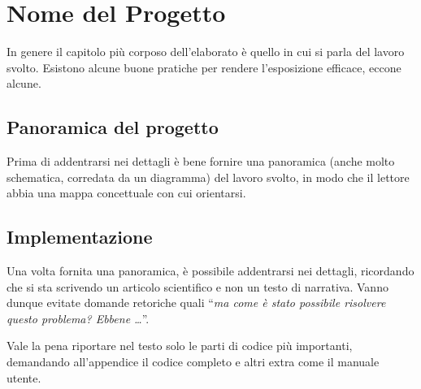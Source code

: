 \chapter{Nome del Progetto}
\label{cap4}

In genere il capitolo più corposo dell'elaborato è quello in cui si parla del lavoro svolto. Esistono alcune buone pratiche per rendere l'esposizione efficace, eccone alcune.

\section{Panoramica del progetto}

Prima di addentrarsi nei dettagli è bene fornire una panoramica (anche molto schematica, corredata da un diagramma) del lavoro svolto, in modo che il lettore abbia una mappa concettuale con cui orientarsi.

\section{Implementazione}

Una volta fornita una panoramica, è possibile addentrarsi nei dettagli, ricordando che si sta scrivendo un articolo scientifico e non un testo di narrativa. Vanno dunque evitate domande retoriche quali ``\textit{ma come è stato possibile risolvere questo problema? Ebbene \ldots}''.

Vale la pena riportare nel testo solo le parti di codice più importanti, demandando all'appendice il codice completo e altri extra come il manuale utente.
